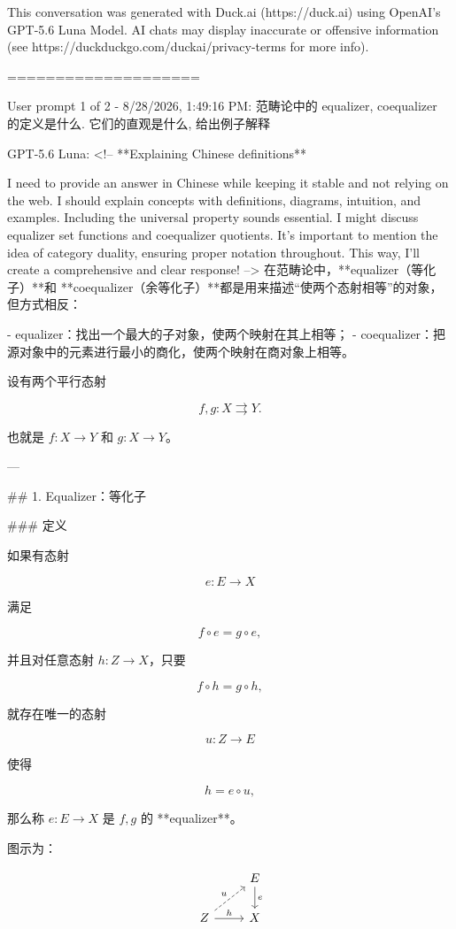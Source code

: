 \documentclass{ctexart}
\begin{document}
\begin{markdown}
This conversation was generated with Duck.ai (https://duck.ai) using OpenAI's GPT-5.6 Luna Model. AI chats may display inaccurate or offensive information (see https://duckduckgo.com/duckai/privacy-terms for more info).

====================

User prompt 1 of 2 - 8/28/2026, 1:49:16 PM:
范畴论中的 equalizer, coequalizer 的定义是什么. 它们的直观是什么, 给出例子解释

GPT-5.6 Luna:
<!-- **Explaining Chinese definitions**

I need to provide an answer in Chinese while keeping it stable and not relying on the web. I should explain concepts with definitions, diagrams, intuition, and examples. Including the universal property sounds essential. I might discuss equalizer set functions and coequalizer quotients. It’s important to mention the idea of category duality, ensuring proper notation throughout. This way, I'll create a comprehensive and clear response! -->
在范畴论中，**equalizer（等化子）**和 **coequalizer（余等化子）**都是用来描述“使两个态射相等”的对象，但方式相反：

- equalizer：找出一个最大的子对象，使两个映射在其上相等；
- coequalizer：把源对象中的元素进行最小的商化，使两个映射在商对象上相等。

设有两个平行态射

$$
f,g:X\rightrightarrows Y.
$$

也就是 $f:X\to Y$ 和 $g:X\to Y$。

---

## 1. Equalizer：等化子

### 定义

如果有态射

$$
e:E\to X
$$

满足

$$
f\circ e=g\circ e,
$$

并且对任意态射 $h:Z\to X$，只要

$$
f\circ h=g\circ h,
$$

就存在唯一的态射

$$
u:Z\to E
$$

使得

$$
h=e\circ u,
$$

那么称 $e:E\to X$ 是 $f,g$ 的 **equalizer**。

图示为：
\end{markdown}
\[
\begin{tikzcd}
& E \arrow[d,"e"] \\
Z \arrow[ur,"u",dashed] \arrow[r,"h"] & X
\end{tikzcd}
\]
\end{document}
